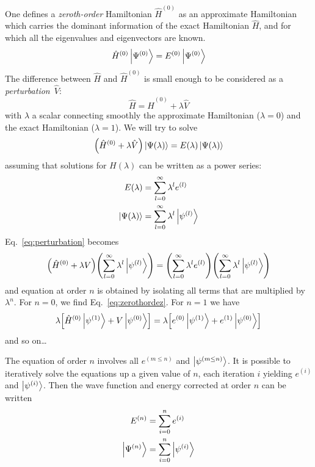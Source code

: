 \documentclass[./thesis.tex]{subfiles}
\begin{document}
One defines a \emph{zeroth-order} Hamiltonian $\hat{H}^{(0)}$ as an approximate Hamiltonian which carries the dominant information of the exact Hamiltonian $\hat{H}$, and for which all the eigenvalues and eigenvectors are known.
\begin{equation}
\label{eq:zerothordez}
\hat{H}^{(0)} \ket {\Psi^{(0)}} = E^{(0)} \ket{\Psi^{(0)}}
\end{equation}
The difference between $\hat{H}$ and
$\hat{H}^{(0)}$ is small enough to be considered as a \emph{perturbation}~$\hat{V}$:
\begin{equation}
\hat{H} = \hat{H}^{(0)} + \lambda \hat{V}
\end{equation}
with $\lambda$ a scalar connecting smoothly the approximate Hamiltonian ($\lambda=0$) and the exact Hamiltonian ($\lambda=1$). We will try to solve
\begin{equation}
\label{eq:perturbation}
\qty(\hat{H}^{(0)} + \lambda \hat{V}) \ket {\Psi (\lambda)} = E(\lambda)\ket {\Psi (\lambda)}
\end{equation}
assuming that solutions for $H(\lambda)$ can be written as a power series:
\begin{align}
E(\lambda) & = \sum_{l=0}^{\infty} \lambda^l e^{(l)}  \\
\ket {\Psi (\lambda)} & = \sum_{l=0}^{\infty} \lambda^l \ket {\psi^{(l)}} 
\end{align}
Eq.~\eqref{eq:perturbation} becomes
\begin{equation}
\qty(\hat{H}^{(0)} + \lambda V) \qty( \sum_{l=0}^{\infty} \lambda^l \ket {\psi^{(l)}} )  = \qty( \sum_{l=0}^{\infty} \lambda^l e^{(l)} ) \qty( \sum_{l=0}^{\infty} \lambda^l \ket {\psi^{(l)}} )
\end{equation}
and equation at order $n$ is obtained by isolating all terms that are multiplied by $\lambda^n$. For $n=0$, we find Eq.~\eqref{eq:zerothordez}. For $n=1$ we have
\begin{equation}
\lambda \qty[ \hat{H}^{(0)} \ket {\psi^{(1)}} + V \ket {\psi^{(0)}} ] = \lambda \qty[ e^{(0)} \ket {\psi^{(1)}} + e^{(1)} \ket {\psi^{(0)}} ]
\end{equation}
and so on\dots

The equation of order $n$ involves all $e^{(m \leq n)}$ and $\ket {\psi^{(m \leq n)}}$. It is possible to iteratively solve the equations up a given value of $n$, each iteration $i$ yielding $e^{(i)}$ and $\ket {\psi^{(i)}}$. Then the wave function and energy corrected at order $n$ can be written
\begin{align}
E^{(n)} &=\sum_{i=0}^n e^{(i)} \\
\ket {\Psi^{(n)}} &= \sum_{i=0}^n \ket {\psi^{(i)}}
\end{align}
\end{document}
